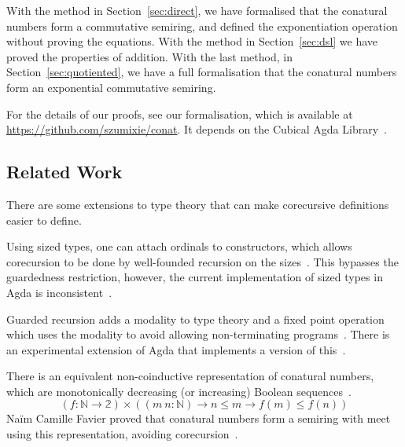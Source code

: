 With the method in Section~\ref{sec:direct}, we have formalised that the
conatural numbers form a commutative semiring, and defined the exponentiation
operation without proving the equations. With the method in
Section~\ref{sec:dsl} we have proved the properties of addition. With the last
method, in Section~\ref{sec:quotiented}, we have a full formalisation that the
conatural numbers form an exponential commutative semiring.

For the details of our proofs, see our formalisation, which is available at
\url{https://github.com/szumixie/conat}. It depends on the Cubical Agda
Library~\cite{agda-cubical}.

\subsection{Related Work}

There are some extensions to type theory that can make corecursive definitions
easier to define.

Using sized types, one can attach ordinals to constructors, which allows
corecursion to be done by well-founded recursion on the
sizes~\cite{hughes-sized, abel-delay}. This bypasses the guardedness
restriction, however, the current implementation of sized types in Agda is
inconsistent~\cite{abel-agda-sized}.

Guarded recursion adds a modality to type theory and a fixed point operation
which uses the modality to avoid allowing non-terminating
programs~\cite{nakano-modality,atkey-productive}. There is an experimental
extension of Agda that implements a version of this~\cite{agda-pi-calculus}.

There is an equivalent non-coinductive representation of conatural numbers,
which are monotonically decreasing (or increasing) Boolean
sequences~\cite{escardo-infinite}.
\[
  (f : \mathbb{N} \to \mathbb{2}) \times ((m\ n : \mathbb{N}) \to n \le m \to f(m) \le f(n))
\]
Naïm Camille Favier proved that conatural numbers form a semiring with meet
using this representation, avoiding corecursion~\cite{favier-conat}.
